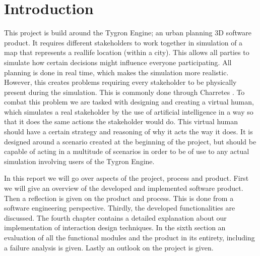 \section{Introduction}

This project is build around the Tygron Engine; an urban planning 3D software product. It requires different stakeholders to work together in simulation of a map that represents a reallife location (within a city). This allows all parties to simulate how certain decisions might influence everyone participating. All planning is done in real time, which makes the simulation more realistic. However, this creates problems requiring every stakeholder to be physically present during the simulation. This is commonly done through Charretes \cite{Todd13}. To combat this problem we are tasked with designing and creating a virtual human, which simulates a real stakeholder by the use of artificial intelligence in a way so that it does the same actions the stakeholder would do. This virtual human should have a certain strategy and reasoning of why it acts the way it does. It is designed around a scenario created at the beginning of the project, but should be capable of acting in a multitude of scenarios in order to be of use to any actual simulation involving users of the Tygron Engine.

In this report we will go over aspects of the project, process and product.\newline
First we will give an overview of the developed and implemented software product. Then a reflection is given on the product and process. This is done from a software engineering perspective. Thirdly, the developed functionalities are discussed. The fourth chapter contains a detailed explanation about our implementation of interaction design techniques. In the sixth section an evaluation of all the functional modules and the product in its entirety, including a failure analysis is given. Lastly an outlook on the project is given.
\newpage
